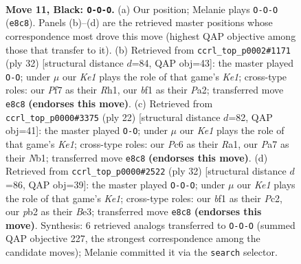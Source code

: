 \documentclass[11pt]{article}
\begin{document}
\clearpage

\begin{figure}[p]\centering
\begin{subfigure}{0.46\textwidth}\centering
\resizebox{\linewidth}{!}{%
\newchessgame
\chessboard[
  setfen={r3k1nr/ppp2ppp/2p1bq2/2b5/8/2P5/PP2QPPP/R1B1KB1R b KQkq - 0 11},
  showmover=false,
  pgfstyle=straightmove, color=movearrow, markmove={e8-c8}
]}
\caption{}
\end{subfigure}\hfill
\begin{subfigure}{0.46\textwidth}\centering
\resizebox{\linewidth}{!}{%
\newchessgame
\chessboard[
  setfen={rqb1k2r/1p1n1ppp/pB2p2b/8/Q7/2PB1NP1/PP3P1P/R3K2R w KQkq - 1 17},
  showmover=false,
  pgfstyle=straightmove, color=movearrow, markmove={e1-g1}
]}
\caption{}
\end{subfigure}
\\[4pt]
\begin{subfigure}{0.46\textwidth}\centering
\resizebox{\linewidth}{!}{%
\newchessgame
\chessboard[
  setfen={r1bqk2r/1p2bppp/p1n1p3/2Pp4/BP6/2P1BQ2/P4PPP/RN2K2R w KQkq - 1 12},
  showmover=false,
  pgfstyle=straightmove, color=movearrow, markmove={e1-g1}
]}
\caption{}
\end{subfigure}\hfill
\begin{subfigure}{0.46\textwidth}\centering
\resizebox{\linewidth}{!}{%
\newchessgame
\chessboard[
  setfen={r1b1kb1r/1p2q2p/p1n3P1/4p3/2B1Q3/4B3/PPP2P1P/R3K2R w KQkq - 1 17},
  showmover=false,
  pgfstyle=straightmove, color=movearrow, markmove={e1-c1}
]}
\caption{}
\end{subfigure}
\caption{\textbf{Move 11, Black: \texttt{O-O-O}.} (a) Our position; Melanie plays \texttt{O-O-O} (\texttt{e8c8}). Panels (b)--(d) are the retrieved master positions whose correspondence most drove this move (highest QAP objective among those that transfer to it). (b) Retrieved from \texttt{ccrl\_top\_p0002\#1171} (ply 32) [structural distance $d$=84, QAP obj=43]: the master played \texttt{O-O}; under $\mu$ our \emph{Ke1} plays the role of that game's \emph{Ke1}; cross-type roles: our \emph{P}f7 as their \emph{R}h1, our \emph{b}f1 as their \emph{P}a2; transferred move \texttt{e8c8} \textbf{(endorses this move)}. (c) Retrieved from \texttt{ccrl\_top\_p0000\#3375} (ply 22) [structural distance $d$=82, QAP obj=41]: the master played \texttt{O-O}; under $\mu$ our \emph{Ke1} plays the role of that game's \emph{Ke1}; cross-type roles: our \emph{P}c6 as their \emph{R}a1, our \emph{P}a7 as their \emph{N}b1; transferred move \texttt{e8c8} \textbf{(endorses this move)}. (d) Retrieved from \texttt{ccrl\_top\_p0000\#2522} (ply 32) [structural distance $d$=86, QAP obj=39]: the master played \texttt{O-O-O}; under $\mu$ our \emph{Ke1} plays the role of that game's \emph{Ke1}; cross-type roles: our \emph{b}f1 as their \emph{P}c2, our \emph{p}b2 as their \emph{B}e3; transferred move \texttt{e8c8} \textbf{(endorses this move)}. Synthesis: 6 retrieved analogs transferred to \texttt{O-O-O} (summed QAP objective 227, the strongest correspondence among the candidate moves); Melanie committed it via the \texttt{search} selector.}
\label{fig:thought-m21}
\end{figure}
\end{document}
